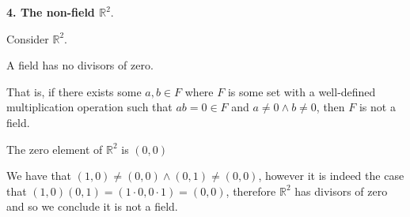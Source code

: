 \documentclass[12pt]{article}
\newcommand{\reals}{\mathbb{R}}
\begin{document}
\textbf{4. The non-field $\reals^2$}.

Consider $\reals^2$.

A field has no divisors of zero.

That is, if there exists some $a,b \in F$ where $F$ is some set
with a well-defined multiplication operation
such that $ab = 0 \in F$ and $a \neq 0 \land b \neq 0$,
then $F$ is not a field.

The zero element of $\reals^2$ is $(0,0)$

We have that $(1,0) \neq (0,0) \land (0,1) \neq (0,0)$,
however it is indeed the case that $(1,0)(0,1) = (1\cdot 0, 0 \cdot 1) = (0,0)$,
therefore $\reals^2$ has divisors of zero and so we conclude it is not a field.
\end{document}
